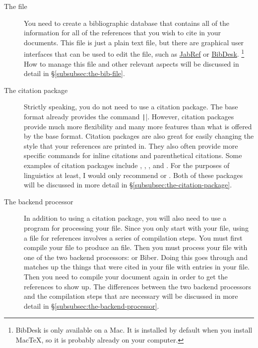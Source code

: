 \begin{description}

	\item[The  file]{%
		You need to create a bibliographic database that contains all of the information for all of the references that you wish to cite in your  documents.
		This file is just a plain text file, but there are graphical user interfaces that can be used to edit the file, such as \href{http://jabref.sourceforge.net/}{JabRef} or \href{http://bibdesk.sourceforge.net/}{BibDesk}.%
		\footnote{%
		BibDesk is only available on a Mac.
		It is installed by default when you install {Mac\TeX}, so it is probably already on your computer.%
		}
		How to manage this file and other relevant aspects will be discussed in detail in \S\ref{subsubsec:the-bib-file}.%
	}
	
	\item[The citation package]{%
		Strictly speaking, you do not need to use a citation package.
		The base  format already provides the command \texttt|\cite{...}|.
		However, citation packages provide much more flexibility and many more features than what is offered by the base  format.
		Citation packages are also great for easily changing the style that your references are printed in.
		They also often provide more specific commands for inline citations and parenthetical citations.
		Some examples of citation packages include , , , and .
		For the purposes of linguistics at least, I would only recommend  or .
		Both of these packages will be discussed in more detail in \S\ref{subsubsec:the-citation-package}.%
	}
	
	\item[The backend processor]{%
		In addition to using a citation package, you will also need to use a program for processing your  file.
		Since you only start with your  file, using a  file for references involves a series of compilation steps.
		You must first compile your  file to produce an  file.
		Then you must process your  file with one of the two backend processors:  or Biber.
		Doing this goes through and matches up the things that were cited in your  file with entries in your  file.
		Then you need to compile your  document again in order to get the references to show up.
		The differences between the two backend processors and the compilation steps that are necessary will be discussed in more detail in \S\ref{subsubsec:the-backend-processor}.%
	}

\end{description}

